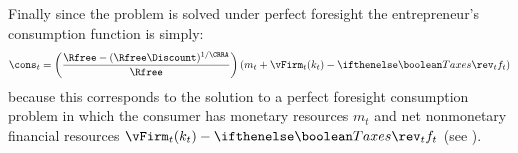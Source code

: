 Finally since the problem is solved under perfect foresight the entrepreneur's consumption function is simply:
\begin{equation}\begin{gathered}\begin{aligned}
    \cons_t=\left(\frac{\Rfree-(\Rfree\Discount)^{1/\CRRA}}{\Rfree}\right)(m_t+\vFirm_{t}(k_{t})-\ifTax{\rev_t}{f_t})
\end{aligned}\end{gathered}\end{equation}
because this corresponds to the solution to a perfect foresight consumption problem in which the consumer has monetary resources $m_{t}$ and net nonmonetary financial resources $\vFirm_{t}(k_{t})-\ifTax{\rev_t}{f_t}$ (see ).


